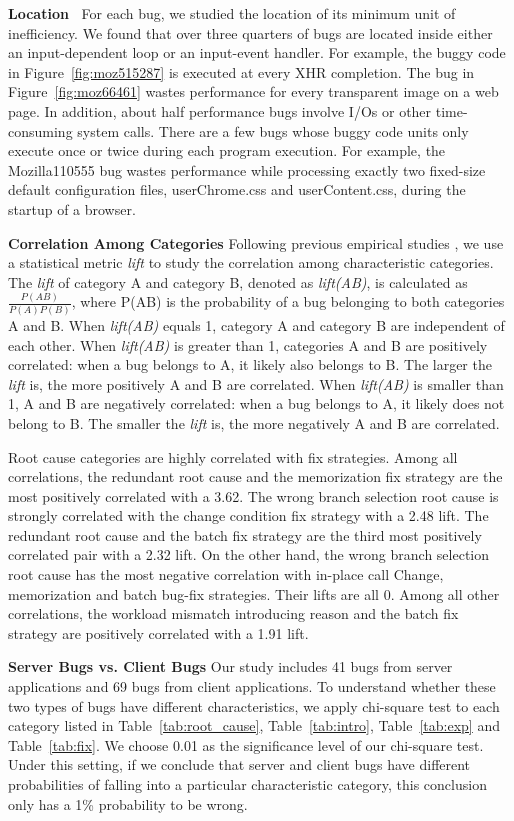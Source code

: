 {\bf Location\ } For each bug, we studied the location of its
minimum unit of inefficiency. We found that 
over three quarters of bugs are
located inside either an input-dependent loop or an input-event handler. 
For example, the buggy code in Figure~\ref{fig:moz515287}
is executed at every XHR completion.
The bug in Figure~\ref{fig:moz66461} wastes performance
for every transparent image on a web page.
In addition, about half performance bugs involve I/Os or 
other time-consuming system calls. 
There are a few bugs whose buggy code units only execute once or twice
during each program execution. For example, the Mozilla110555 bug wastes
performance while processing exactly two fixed-size
default configuration files,
userChrome.css and userContent.css, during the startup of a browser.

{\bf Correlation Among Categories}
Following previous empirical studies \citep{LiASID06}, we use a statistical 
metric {\it lift} to study the correlation among characteristic categories.
The {\it lift} of category A and category B, denoted as {\it lift(AB)}, 
    is calculated 
as $\frac{P(AB)}{P(A)P(B)}$, where P(AB) is the probability of a bug belonging 
to both categories A and B. When {\it lift(AB)} equals 1,   
category A and category B are independent of each other.
When {\it lift(AB)} is greater than 1, categories A and B are 
positively correlated: when a bug belongs to A, it likely
also belongs to B. The larger the {\it lift} is, the more positively A and B
are correlated.
When {\it lift(AB)} is smaller than 1, A and B are negatively
correlated: when a bug belongs to A, it likely does not belong to B.
The smaller the {\it lift} is, the more negatively A and B are correlated.

Root cause categories are highly correlated with fix strategies. 
Among all correlations, the redundant root cause and the memorization fix strategy are 
the most positively correlated with a 3.62. 
The wrong branch selection root cause is strongly correlated with the change condition 
fix strategy with a 2.48 lift. The redundant root cause and the batch fix strategy are the third 
most positively correlated pair with a 2.32 lift. 
On the other hand, the wrong branch selection root cause has the most negative correlation 
with in-place call Change, memorization and batch bug-fix strategies. 
Their lifts are all 0. 
Among all other correlations, the workload mismatch introducing reason and the batch fix strategy 
are positively correlated with a 1.91 lift.


{\bf Server Bugs vs. Client Bugs}
Our study includes 41 bugs from server applications and 69 bugs from client 
applications. To understand whether these two types of bugs have different 
characteristics, we apply chi-square test
\citep{chisquared} to each
category listed in Table~\ref{tab:root_cause}, Table~\ref{tab:intro}, Table~\ref{tab:exp} and Table~\ref{tab:fix}.
We choose 0.01 as the significance level of our chi-square test. 
Under this setting, if we conclude that server and client bugs have different
probabilities of falling into a particular characteristic category, 
this conclusion only has a 1\% probability to be wrong. 

